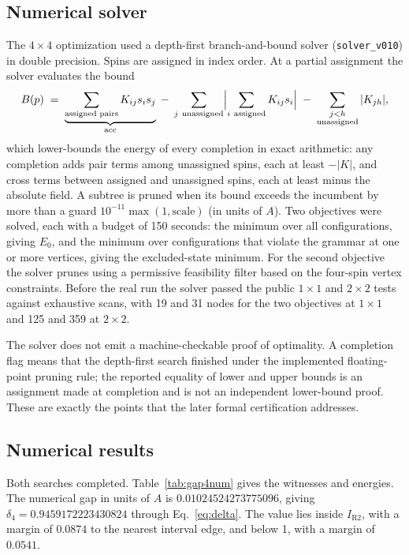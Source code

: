 \documentclass[11pt,a4paper]{article}
\theoremstyle{plain}
\theoremstyle{definition}
\theoremstyle{remark}
\newcommand{\lean}[1]{\nolinkurl{#1}}
\newcommand{\Eo}{E_{0}}
\newcommand{\intervalR}{I_{\mathrm{R2}}}
\begin{document}
\subsection{Numerical solver}
The $4\times4$ optimization used a depth-first branch-and-bound solver (\lean{solver_v010}) in double precision. Spins are assigned in index order. At a partial assignment the solver evaluates the bound
\[
B(p)\;=\;\underbrace{\sum_{\text{assigned pairs}}K_{ij}s_is_j}_{\text{acc}}\;-\;\sum_{j\ \text{unassigned}}\Bigl|\sum_{i\ \text{assigned}}K_{ij}s_i\Bigr|\;-\;\sum_{\substack{j<h\\ \text{unassigned}}}|K_{jh}|,
\]
which lower-bounds the energy of every completion in exact arithmetic: any completion adds pair terms among unassigned spins, each at least $-|K|$, and cross terms between assigned and unassigned spins, each at least minus the absolute field. A subtree is pruned when its bound exceeds the incumbent by more than a guard $10^{-11}\max(1,\mathrm{scale})$ (in units of $A$). Two objectives were solved, each with a budget of 150 seconds: the minimum over all configurations, giving $\Eo$, and the minimum over configurations that violate the grammar at one or more vertices, giving the excluded-state minimum. For the second objective the solver prunes using a permissive feasibility filter based on the four-spin vertex constraints. Before the real run the solver passed the public $1\times1$ and $2\times2$ tests against exhaustive scans, with 19 and 31 nodes for the two objectives at $1\times1$ and 125 and 359 at $2\times2$.

The solver does not emit a machine-checkable proof of optimality. A completion flag means that the depth-first search finished under the implemented floating-point pruning rule; the reported equality of lower and upper bounds is an assignment made at completion and is not an independent lower-bound proof. These are exactly the points that the later formal certification addresses.

\subsection{Numerical results}
Both searches completed. Table~\ref{tab:gap4num} gives the witnesses and energies. The numerical gap in units of $A$ is $0.01024524273775096$, giving $\delta_4=0.9459172223430824$ through Eq.~\eqref{eq:delta}. The value lies inside $\intervalR$, with a margin of $0.0874$ to the nearest interval edge, and below 1, with a margin of $0.0541$.
\end{document}
